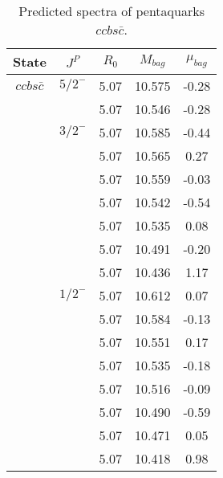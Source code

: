 \documentclass[prd,twocolumn,floatfix,nofootinbib]{revtex4}
\begin{document}
\renewcommand{\tabcolsep}{0.5cm}
\renewcommand{\arraystretch}{1.2}
\begin{table*}[!htbp]
    \caption{Predicted spectra of pentaquarks $ccbs\bar{c}$.}
    \begin{tabular}{ccccc}
        \hline\hline
        {\rm State} &$J^{P}$ &$R_{0}$ &$M_{bag}$ &$\mu_{bag}$ \\ \hline
        ${ccbs\bar{c}}$
            &${5/2}^{-}$    &5.07   &10.575 &-0.28 \\
            &               &5.07   &10.546 &-0.28 \\
            &${3/2}^{-}$    &5.07   &10.585 &-0.44 \\
            &               &5.07   &10.565 &0.27 \\
            &               &5.07   &10.559 &-0.03 \\
            &               &5.07   &10.542 &-0.54 \\
            &               &5.07   &10.535 &0.08 \\
            &               &5.07   &10.491 &-0.20 \\
            &               &5.07   &10.436 &1.17 \\
            &${1/2}^{-}$    &5.07   &10.612 &0.07 \\
            &               &5.07   &10.584 &-0.13 \\
            &               &5.07   &10.551 &0.17 \\
            &               &5.07   &10.535 &-0.18 \\
            &               &5.07   &10.516 &-0.09 \\
            &               &5.07   &10.490 &-0.59 \\
            &               &5.07   &10.471 &0.05 \\
            &               &5.07   &10.418 &0.98 \\
        \hline\hline 
    \end{tabular}
\end{table*}
\end{document}
